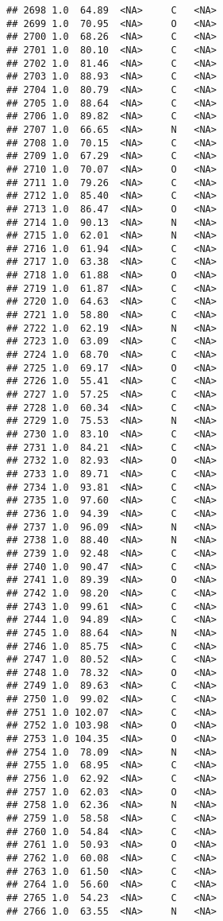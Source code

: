 \documentclass[
]{article}
\begin{document}
\begin{verbatim}
## 2698 1.0  64.89  <NA>     C   <NA>
## 2699 1.0  70.95  <NA>     O   <NA>
## 2700 1.0  68.26  <NA>     C   <NA>
## 2701 1.0  80.10  <NA>     C   <NA>
## 2702 1.0  81.46  <NA>     C   <NA>
## 2703 1.0  88.93  <NA>     C   <NA>
## 2704 1.0  80.79  <NA>     C   <NA>
## 2705 1.0  88.64  <NA>     C   <NA>
## 2706 1.0  89.82  <NA>     C   <NA>
## 2707 1.0  66.65  <NA>     N   <NA>
## 2708 1.0  70.15  <NA>     C   <NA>
## 2709 1.0  67.29  <NA>     C   <NA>
## 2710 1.0  70.07  <NA>     O   <NA>
## 2711 1.0  79.26  <NA>     C   <NA>
## 2712 1.0  85.40  <NA>     C   <NA>
## 2713 1.0  86.47  <NA>     O   <NA>
## 2714 1.0  90.13  <NA>     N   <NA>
## 2715 1.0  62.01  <NA>     N   <NA>
## 2716 1.0  61.94  <NA>     C   <NA>
## 2717 1.0  63.38  <NA>     C   <NA>
## 2718 1.0  61.88  <NA>     O   <NA>
## 2719 1.0  61.87  <NA>     C   <NA>
## 2720 1.0  64.63  <NA>     C   <NA>
## 2721 1.0  58.80  <NA>     C   <NA>
## 2722 1.0  62.19  <NA>     N   <NA>
## 2723 1.0  63.09  <NA>     C   <NA>
## 2724 1.0  68.70  <NA>     C   <NA>
## 2725 1.0  69.17  <NA>     O   <NA>
## 2726 1.0  55.41  <NA>     C   <NA>
## 2727 1.0  57.25  <NA>     C   <NA>
## 2728 1.0  60.34  <NA>     C   <NA>
## 2729 1.0  75.53  <NA>     N   <NA>
## 2730 1.0  83.10  <NA>     C   <NA>
## 2731 1.0  84.21  <NA>     C   <NA>
## 2732 1.0  82.93  <NA>     O   <NA>
## 2733 1.0  89.71  <NA>     C   <NA>
## 2734 1.0  93.81  <NA>     C   <NA>
## 2735 1.0  97.60  <NA>     C   <NA>
## 2736 1.0  94.39  <NA>     C   <NA>
## 2737 1.0  96.09  <NA>     N   <NA>
## 2738 1.0  88.40  <NA>     N   <NA>
## 2739 1.0  92.48  <NA>     C   <NA>
## 2740 1.0  90.47  <NA>     C   <NA>
## 2741 1.0  89.39  <NA>     O   <NA>
## 2742 1.0  98.20  <NA>     C   <NA>
## 2743 1.0  99.61  <NA>     C   <NA>
## 2744 1.0  94.89  <NA>     C   <NA>
## 2745 1.0  88.64  <NA>     N   <NA>
## 2746 1.0  85.75  <NA>     C   <NA>
## 2747 1.0  80.52  <NA>     C   <NA>
## 2748 1.0  78.32  <NA>     O   <NA>
## 2749 1.0  89.63  <NA>     C   <NA>
## 2750 1.0  99.02  <NA>     C   <NA>
## 2751 1.0 102.07  <NA>     C   <NA>
## 2752 1.0 103.98  <NA>     O   <NA>
## 2753 1.0 104.35  <NA>     O   <NA>
## 2754 1.0  78.09  <NA>     N   <NA>
## 2755 1.0  68.95  <NA>     C   <NA>
## 2756 1.0  62.92  <NA>     C   <NA>
## 2757 1.0  62.03  <NA>     O   <NA>
## 2758 1.0  62.36  <NA>     N   <NA>
## 2759 1.0  58.58  <NA>     C   <NA>
## 2760 1.0  54.84  <NA>     C   <NA>
## 2761 1.0  50.93  <NA>     O   <NA>
## 2762 1.0  60.08  <NA>     C   <NA>
## 2763 1.0  61.50  <NA>     C   <NA>
## 2764 1.0  56.60  <NA>     C   <NA>
## 2765 1.0  54.23  <NA>     C   <NA>
## 2766 1.0  63.55  <NA>     N   <NA>

\end{verbatim}
\end{document}
